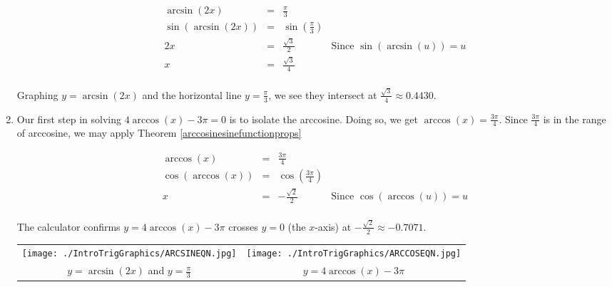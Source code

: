 \begin{ex}
\begin{enumerate}
\[\begin{array}{rclr}
\arcsin(2x) & = & \frac{\pi}{3} & \\
\sin\left(\arcsin(2x)\right) & = & \sin\left(\frac{\pi}{3}\right) & \\ [5pt]
2x & = & \frac{\sqrt{3}}{2} & \text{Since $\sin(\arcsin(u)) = u$} \\ [5pt]
x & = & \frac{\sqrt{3}}{4} & \\ \end{array} \]



Graphing $y = \arcsin(2x)$ and the horizontal line $y = \frac{\pi}{3}$, we see they intersect at $\frac{\sqrt{3}}{4} \approx 0.4430$.

\item Our first step in solving $4\arccos(x)-3\pi = 0$ is to isolate the arccosine. Doing so, we get $\arccos(x) = \frac{3\pi}{4}$.  Since $\frac{3\pi}{4}$ is in the range of arccosine, we may apply Theorem \ref{arccosinesinefunctionprops}

\[ \begin{array}{rclr}

\arccos(x) & = & \frac{3\pi}{4} & \\ [5pt]
\cos\left(\arccos(x)\right) & = & \cos\left(\frac{3\pi}{4}\right) & \\ [5pt]
x & = & -\frac{\sqrt{2}}{2} & \text{Since $\cos(\arccos(u)) = u$} \\ \end{array} \]



The calculator confirms $y = 4\arccos(x) - 3\pi$ crosses $y = 0$ (the $x$-axis) at $-\frac{\sqrt{2}}{2} \approx -0.7071$.



\begin{center}

\begin{tabular}{cc}

\texttt{[image: ./IntroTrigGraphics/ARCSINEQN.jpg]} &

\hspace{1in} \texttt{[image: ./IntroTrigGraphics/ARCCOSEQN.jpg]} \\

$y = \arcsin(2x)$ and \boldmath $y = \frac{\pi}{3}$     & 

 \hspace{1in}  $y=4\arccos(x) - 3\pi$ \\

\end{tabular}


\end{center}
\end{enumerate}
\end{ex}

